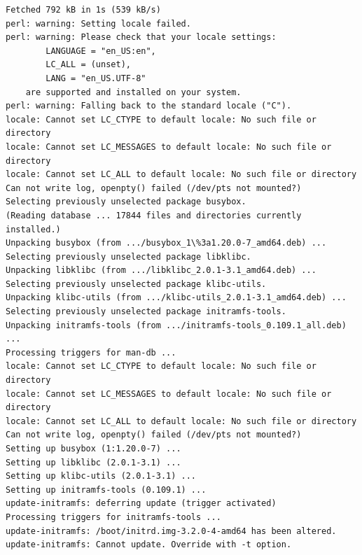 \documentclass[11pt
  , a4paper
  , article
  , oneside
]{memoir}
\begin{document}
\begin{lstlisting}
Fetched 792 kB in 1s (539 kB/s)          
perl: warning: Setting locale failed.
perl: warning: Please check that your locale settings:
        LANGUAGE = "en_US:en",
        LC_ALL = (unset),
        LANG = "en_US.UTF-8"
    are supported and installed on your system.
perl: warning: Falling back to the standard locale ("C").
locale: Cannot set LC_CTYPE to default locale: No such file or directory
locale: Cannot set LC_MESSAGES to default locale: No such file or directory
locale: Cannot set LC_ALL to default locale: No such file or directory
Can not write log, openpty() failed (/dev/pts not mounted?)
Selecting previously unselected package busybox.
(Reading database ... 17844 files and directories currently installed.)
Unpacking busybox (from .../busybox_1\%3a1.20.0-7_amd64.deb) ...
Selecting previously unselected package libklibc.
Unpacking libklibc (from .../libklibc_2.0.1-3.1_amd64.deb) ...
Selecting previously unselected package klibc-utils.
Unpacking klibc-utils (from .../klibc-utils_2.0.1-3.1_amd64.deb) ...
Selecting previously unselected package initramfs-tools.
Unpacking initramfs-tools (from .../initramfs-tools_0.109.1_all.deb) ...
Processing triggers for man-db ...
locale: Cannot set LC_CTYPE to default locale: No such file or directory
locale: Cannot set LC_MESSAGES to default locale: No such file or directory
locale: Cannot set LC_ALL to default locale: No such file or directory
Can not write log, openpty() failed (/dev/pts not mounted?)
Setting up busybox (1:1.20.0-7) ...
Setting up libklibc (2.0.1-3.1) ...
Setting up klibc-utils (2.0.1-3.1) ...
Setting up initramfs-tools (0.109.1) ...
update-initramfs: deferring update (trigger activated)
Processing triggers for initramfs-tools ...
update-initramfs: /boot/initrd.img-3.2.0-4-amd64 has been altered.
update-initramfs: Cannot update. Override with -t option.


\end{lstlisting}
\end{document}
